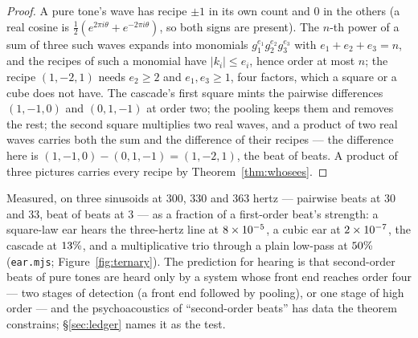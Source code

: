 \begin{proof}
A pure tone's wave has recipe $\pm1$ in its own count and $0$ in the
others (a real cosine is $\tfrac12(e^{2\pi i\theta}+e^{-2\pi i\theta})$, so
both signs are present). The $n$-th power of a sum of three such waves
expands into monomials $g_1^{e_1}g_2^{e_2}g_3^{e_3}$ with
$e_1+e_2+e_3=n$, and the recipes of such a monomial have $|k_i|\le e_i$,
hence order at most $n$; the recipe $(1,-2,1)$ needs $e_2\ge2$ and
$e_1,e_3\ge1$, four factors, which a square or a cube does not have. The
cascade's first square mints the pairwise differences $(1,-1,0)$ and
$(0,1,-1)$ at order two; the pooling keeps them and removes the rest; the
second square multiplies two real waves, and a product of two real waves
carries both the sum and the difference of their recipes --- the
difference here is $(1,-1,0)-(0,1,-1)=(1,-2,1)$, the beat of beats. A
product of three pictures carries every recipe by
Theorem~\ref{thm:whosees}.
\end{proof}

Measured, on three sinusoids at $300$, $330$ and $363$ hertz --- pairwise
beats at $30$ and $33$, beat of beats at $3$ --- as a fraction of a
first-order beat's strength: a square-law ear hears the three-hertz line
at $8\times 10^{-5}$, a cubic ear at $2\times 10^{-7}$, the cascade at
$13\%$, and a multiplicative trio through a plain
low-pass at $50\%$ (\texttt{ear.mjs};
Figure~\ref{fig:ternary}). The prediction for hearing is that second-order
beats of pure tones are heard only by a system whose front end reaches
order four --- two stages of detection (a front end followed by pooling),
or one stage of high order --- and the psychoacoustics of ``second-order
beats'' has data the theorem constrains; \S\ref{sec:ledger} names it as
the test.

